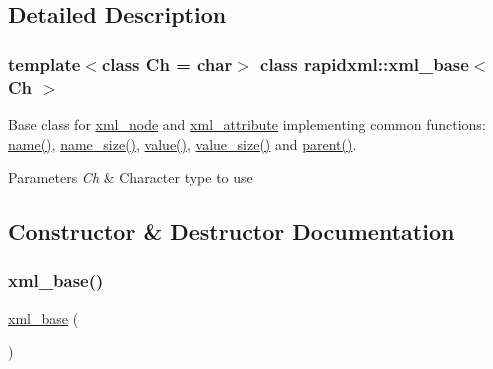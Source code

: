 \subsection{Detailed Description}
\subsubsection*{template$<$class Ch = char$>$\newline
class rapidxml\+::xml\+\_\+base$<$ Ch $>$}

Base class for \mbox{\hyperlink{classrapidxml_1_1xml__node}{xml\+\_\+node}} and \mbox{\hyperlink{classrapidxml_1_1xml__attribute}{xml\+\_\+attribute}} implementing common functions\+: \mbox{\hyperlink{classrapidxml_1_1xml__base_af8436e9ee14c127220113eaa956eafee}{name()}}, \mbox{\hyperlink{classrapidxml_1_1xml__base_ad01e2eff02202b130baad012d1ed7328}{name\+\_\+size()}}, \mbox{\hyperlink{classrapidxml_1_1xml__base_a558b1045e6751e4024309d41bf35c542}{value()}}, \mbox{\hyperlink{classrapidxml_1_1xml__base_aa6981b3244607ea4ae7634f74f25361b}{value\+\_\+size()}} and \mbox{\hyperlink{classrapidxml_1_1xml__base_a7f177e162f72f65ea1f0f0188e41c1ba}{parent()}}. 


\begin{DoxyParams}{Parameters}
{\em Ch} & Character type to use \\
\hline
\end{DoxyParams}


\subsection{Constructor \& Destructor Documentation}
\mbox{\label{classrapidxml_1_1xml__base_a23630d2c130a9e0e3f3afa7584a9b218}} 
\subsubsection{\texorpdfstring{xml\+\_\+base()}{xml\_base()}}
{\footnotesize\ttfamily \mbox{\hyperlink{classrapidxml_1_1xml__base}{xml\+\_\+base}} (\begin{DoxyParamCaption}{ }\end{DoxyParamCaption})\hspace{0.3cm}{\ttfamily [inline]}}



